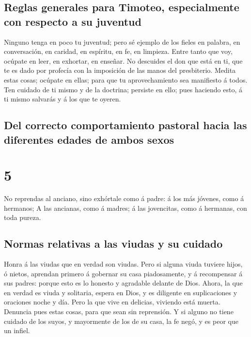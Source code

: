 \hypertarget{reglas-generales-para-timoteo-especialmente-con-respecto-a-su-juventud}{%
\subsection{Reglas generales para Timoteo, especialmente con respecto a
su
juventud}\label{reglas-generales-para-timoteo-especialmente-con-respecto-a-su-juventud}}

 Ninguno tenga en poco tu juventud; pero sé ejemplo de
los fieles en palabra, en conversación, en caridad, en espíritu, en fe,
en limpieza.  Entre tanto que voy, ocúpate en leer, en
exhortar, en enseñar.  No descuides el don que está en
ti, que te es dado por profecía con la imposición de las manos del
presbiterio.  Medita estas cosas; ocúpate en ellas; para
que tu aprovechamiento sea manifiesto á todos.  Ten
cuidado de ti mismo y de la doctrina; persiste en ello; pues haciendo
esto, á ti mismo salvarás y á los que te oyeren.

\hypertarget{del-correcto-comportamiento-pastoral-hacia-las-diferentes-edades-de-ambos-sexos}{%
\subsection{Del correcto comportamiento pastoral hacia las diferentes
edades de ambos
sexos}\label{del-correcto-comportamiento-pastoral-hacia-las-diferentes-edades-de-ambos-sexos}}

\hypertarget{section-54-5}{%
\section{5}\label{section-54-5}}

 No reprendas al anciano, sino exhórtale como á padre: á
los más jóvenes, como á hermanos;  A las ancianas, como á
madres; á las jovencitas, como á hermanas, con toda pureza.

\hypertarget{normas-relativas-a-las-viudas-y-su-cuidado}{%
\subsection{Normas relativas a las viudas y su
cuidado}\label{normas-relativas-a-las-viudas-y-su-cuidado}}

 Honra á las viudas que en verdad son viudas.
 Pero si alguna viuda tuviere hijos, ó nietos, aprendan
primero á gobernar su casa piadosamente, y á recompensar á sus padres:
porque esto es lo honesto y agradable delante de Dios. 
Ahora, la que en verdad es viuda y solitaria, espera en Dios, y es
diligente en suplicaciones y oraciones noche y día.  Pero
la que vive en delicias, viviendo está muerta.  Denuncia
pues estas cosas, para que sean sin reprensión.  Y si
alguno no tiene cuidado de los suyos, y mayormente de los de su casa, la
fe negó, y es peor que un infiel.

